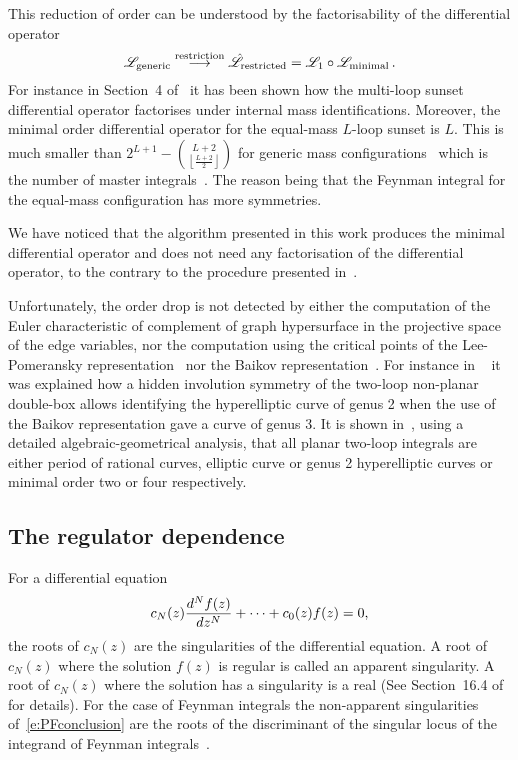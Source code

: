 \documentclass[a4paper,12pt]{article}
\numberwithin{equation}{section}
\numberwithin{figure}{section}
\begin{document}
This reduction of order can be
understood by the factorisability of the differential operator
\begin{equation}
  \mathscr{L}_{\rm generic} \stackrel{\rm restriction}{\longrightarrow}
  \hat{\mathscr{L}}_{\rm restricted}   = \mathscr{L}_1 \circ\mathscr{L}_{\rm minimal} \,.
\end{equation}
For instance in Section~4 of~\cite{Lairez:2022zkj} it has been shown
how the multi-loop sunset differential operator factorises under
internal mass identifications. Moreover,
the minimal order differential operator for the equal-mass $L$-loop sunset is $L$. This is much smaller than 
$2^{L+1}-\binom{L+2}{\left\lfloor \frac{L+2}{2}\right\rfloor }$ for generic
mass configurations~\cite{Lairez:2022zkj} which is the number of
master integrals~\cite{Bitoun:2017nre}.
The reason being that the Feynman integral for the equal-mass
configuration has more symmetries.  

We have noticed that the algorithm presented in this work produces 
the minimal  differential operator and does not need any factorisation
of the differential operator, to the contrary to the procedure
presented in~\cite{Pogel:2022vat}. 
%
%

Unfortunately, the order drop is not detected by  either the
computation of the Euler characteristic of complement of graph
hypersurface in the projective space of the edge variables, nor the
computation using the critical points of the
Lee-Pomeransky representation~\cite{Lee:2013hzt}   nor the
Baikov
representation~\cite{Frellesvig:2017aai,Frellesvig:2019uqt,Cacciatori:2021nli}.
For instance in ~\cite{Marzucca:2023gto} it was explained how a hidden involution symmetry of the
two-loop non-planar double-box allows identifying the hyperelliptic
curve of genus 2 when the use of the Baikov representation gave a
curve of genus 3.
It is shown in~\cite{Doran:2023yzu}, using
a detailed  algebraic-geometrical analysis, that all planar two-loop
integrals are either period of rational curves, elliptic curve or genus
2 hyperelliptic curves or minimal order two or four respectively.

\subsection{The regulator dependence}
\label{sec:epsilon-dependence}

%
For a differential equation
\begin{equation}\label{e:PFconclusion}
c_N(z)  {d^Nf(z)\over dz^N}+\cdots + c_0(z) f(z)=0,
\end{equation}
the roots of $c_N(z)$ are the singularities of the differential
equation. A root of $c_N(z)$ where the solution $f(z)$ is
regular is called an apparent singularity. A root of $c_N(z)$
where the solution has a singularity is a real (See 
Section~16.4 of~\cite{Ince} for details). 
%
For the case of Feynman integrals the non-apparent singularities
of~\eqref{e:PFconclusion} are the roots of the
discriminant of the singular locus of the integrand of  Feynman
integrals~\cite{Doran:2023yzu}.
\end{document}
